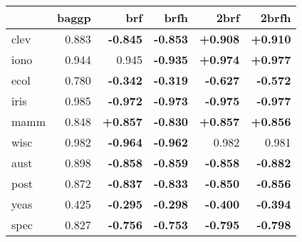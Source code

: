 \begin{tabular}{lrrrrr}
\toprule
{} &  baggp &    brf &   brfh &   2brf &  2brfh \\
\midrule
clev & 0.883 &    \textbf{-0.845} &    \textbf{-0.853} & \textbf{+0.908} & \textbf{+0.910} \\
iono & 0.944 & 0.945 &    \textbf{-0.935} & \textbf{+0.974} & \textbf{+0.977} \\
ecol & 0.780 &    \textbf{-0.342} &    \textbf{-0.319} &    \textbf{-0.627} &    \textbf{-0.572} \\
iris & 0.985 &    \textbf{-0.972} &    \textbf{-0.973} &    \textbf{-0.975} &    \textbf{-0.977} \\
mamm & 0.848 & \textbf{+0.857} &    \textbf{-0.830} & \textbf{+0.857} & \textbf{+0.856} \\
wisc & 0.982 &    \textbf{-0.964} &    \textbf{-0.962} & 0.982 & 0.981 \\
aust & 0.898 &    \textbf{-0.858} &    \textbf{-0.859} &    \textbf{-0.858} &    \textbf{-0.882} \\
post & 0.872 &    \textbf{-0.837} &    \textbf{-0.833} &    \textbf{-0.850} &    \textbf{-0.856} \\
yeas & 0.425 &    \textbf{-0.295} &    \textbf{-0.298} &    \textbf{-0.400} &    \textbf{-0.394} \\
spec & 0.827 &    \textbf{-0.756} &    \textbf{-0.753} &    \textbf{-0.795} &    \textbf{-0.798} \\
\bottomrule
\end{tabular}
